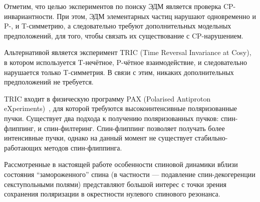 
Отметим, что целью экспериментов по поиску ЭДМ является проверка CP-инвариантности. При этом, ЭДМ элементарных частиц нарушают одновременно и P-, и T-симметрию, а следовательно требуют дополнительных модельных предположений, для того, чтобы связать их существование с CP-нарушением.~\cite[стр.~1926]{Aksentev:TRIC}

Альтернативой является эксперимент TRIC (Time Reversal Invariance at Cosy),~\cite{Aksentev:TRIC} в котором используется T-нечётное, P-чётное взаимодействие, и следовательно нарушается только T-симметрия. В связи с этим, никаких дополнительных предположений не требуется.

TRIC входит в физическую программу PAX (Polarised Antiproton eXperiments)~\cite{Aksentev:PAX}, для которой требуются высокоинтенсивные поляризованные пучки. Существует два подхода к получению поляризованных пучков: спин-флиппинг, и спин-филтеринг. Спин-флиппинг позволяет получать более интенсивные пучки, однако на данный момент не существует стабильно-работающих методов спин-флиппинга.

Рассмотренные в настоящей работе особенности спиновой динамики вблизи состояния ``замороженного'' спина (в частности --- подавление спин-декогеренции секступольными полями) представляют большой интерес с точки зрения сохранения поляризации в окрестности нулевого спинового резонанса.